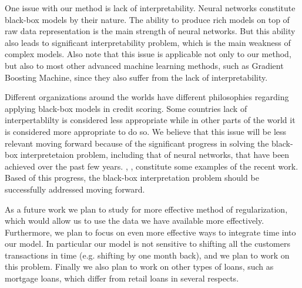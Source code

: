 \documentclass[sigconf]{acmart}
\begin{document}
One issue with our method is lack of interpretability. Neural networks constitute black-box models by their nature. The ability to produce rich models on top of raw data representation is the main strength of neural networks. But this ability also leads to significant interpretability problem, which is the main weakness of complex models. Also note that this issue is applicable not only to our method, but also to most other advanced machine learning methods, such as  Gradient Boosting Machine, since they also suffer from the lack of interpretability.

Different organizations around the worlds have different philosophies regarding applying black-box models in credit scoring. Some countries lack of interpertablilty is considered less appropriate while in other parts of the world it is considered more appropriate to do so. We believe that this issue will be less relevant moving forward because of the significant progress in solving the black-box interpretetaion problem, including that of neural networks, that have been achieved over the past few years. \cite{DBLP:journals/corr/ChoiBSSS16}, \cite{gupta2018lisa}, \cite{mccoy2018rnns} constitute some examples of the recent work. Based of this progress, the black-box interpretation problem should be successfully addressed moving forward.

As a future work we plan to study for more effective method of regularization, which would allow us to use the data we have available more effectively.
Furthermore, we plan to focus on even more effective ways to integrate time into our model. In particular our model is not sensitive to shifting all the customers transactions in time (e.g. shifting by one month back), and we plan to work on this problem.
Finally we also plan to work on other types of loans, such as mortgage loans, which differ from retail loans in several respects.



\end{document}
